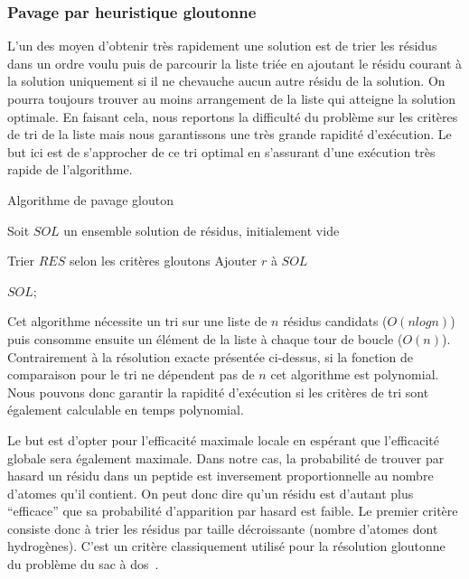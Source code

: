 \subsubsection{Pavage par heuristique gloutonne}

\label{TM_p}

L'un des moyen d'obtenir très rapidement une solution est de trier les résidus dans un ordre voulu puis de parcourir la liste triée en ajoutant le résidu courant à la solution uniquement si il ne chevauche aucun autre résidu de la solution.
On pourra toujours trouver au moins arrangement de la liste qui atteigne la solution optimale.
En faisant cela, nous reportons la difficulté du problème sur les critères de tri de la liste mais nous garantissons une très grande rapidité d'exécution.
Le but ici est de s'approcher de ce tri optimal en s'assurant d'une exécution très rapide de l'algorithme.


\begin{algorithm}[H]
  \caption{Algorithme de pavage glouton}
  Soit $SOL$ un ensemble solution de résidus, initialement vide\;
  
  Trier $RES$ selon les critères gloutons\;
   {
     {
      Ajouter $r$ à $SOL$\;
    }
  }
  
  \KwRet $SOL$;
\end{algorithm}

Cet algorithme nécessite un tri sur une liste de $n$ résidus candidats ($O(n log n)$) puis consomme ensuite un élément de la
liste à chaque tour de boucle ($O(n)$). Contrairement à la résolution exacte présentée ci-dessus, si la fonction de comparaison
pour le tri ne dépendent pas de $n$ cet algorithme est polynomial.
Nous pouvons donc garantir la rapidité d'exécution si les critères de tri sont également calculable en temps polynomial.

Le but est d'opter pour l'efficacité maximale locale en espérant que l'efficacité globale sera également maximale.
Dans notre cas, la probabilité de trouver par hasard un résidu dans un peptide est inversement proportionnelle au nombre d'atomes qu'il contient.
On peut donc dire qu'un résidu est d'autant plus ``efficace'' que sa probabilité d'apparition par hasard est faible.
Le premier critère consiste donc à trier les résidus par taille décroissante (nombre d'atomes dont hydrogènes).
C'est un critère classiquement utilisé pour la résolution gloutonne du problème du sac à dos~\cite{_probleme_2016}.

